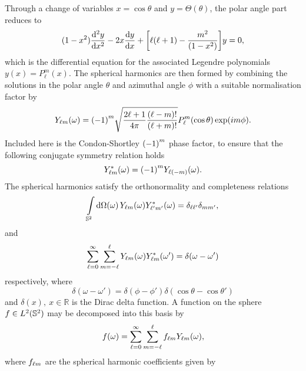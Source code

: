 Through a change of variables \(x=\cos{\theta}\) and \(y=\Theta(\theta)\), the polar angle part reduces to
%
\begin{equation}
    (1-x^{2}) \dv[2]{y}{x} - 2x\dv{y}{x} + \bigg[\ell(\ell+1) - \frac{m^{2}}{(1 - x^{2})}\bigg] y
    = 0,
\end{equation}
%
which is the differential equation for the associated Legendre polynomials \(y(x) = P^{m}_{\ell}(x)\).
The spherical harmonics are then formed by combining the solutions in the polar angle \(\theta{}\) and azimuthal angle \(\phi{}\) with a suitable normalisation factor by
%
\begin{equation}\label{eq:chapter2_spherical_harmonic}
    \pixel{\harmonic{Y}}
    = \phaseFactor \sqrt{\factor \frac{(\ell-m)!}{(\ell+m)!}} P^{m}_{\ell}(\cos{\theta}) \exp(i m\phi).
\end{equation}
%
Included here is the Condon-Shortley \(\phaseFactor{}\) phase factor, to ensure that the following conjugate symmetry relation holds
%
\begin{equation}\label{eq:chapter2_spherical_harmonic_phase}
    \pixel{\conj{\harmonic{Y}}}
    = \phaseFactor \pixel{Y_{\ell(-m)}}.
\end{equation}
%
The spherical harmonics satisfy the orthonormality and completeness relations
%
\begin{equation}\label{eq:chapter2_spherical_harmonics_orthonormal}
    \integrateSphere{\omega} \pixel{\harmonic{Y}} \pixel{\conj{\harmonic[']{Y}}}
    = \delta_{\ell\ell'} \delta_{mm'},
\end{equation}
%
and
%
\begin{equation}
    \sum\limits_{\ell=0}^{\infty} \sum\limits_{m=-\ell}^{\ell} \pixel{\harmonic{Y}} \pixel[']{\conj{\harmonic{Y}}}
    = \delta(\omega-\omega')
\end{equation}
%
respectively, where
%
\begin{equation}
    \delta(\omega-\omega')
    = \delta(\phi-\phi') \delta(\cos{\theta} - \cos{\theta'})
\end{equation}
%
and \(\delta(x),\ x \in \mathbb{R}\) is the Dirac delta function.
A function on the sphere \(f \in \hilbert{\twoSphere}\) may be decomposed into this basis by
%
\begin{equation}
    \pixel{f}
    = \sum\limits_{\ell=0}^{\infty} \sum\limits_{m=-\ell}^{\ell} \harmonic{f} \pixel{\harmonic{Y}},
\end{equation}
%
where \(\harmonic{f}\) are the spherical harmonic coefficients given by

